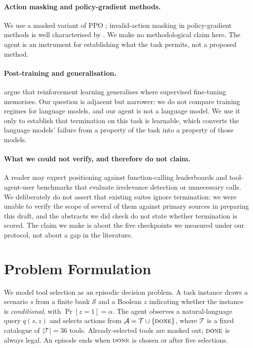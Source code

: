 \documentclass[11pt]{article}
\newcommand{\done}{\ensuremath{\text{\textsc{done}}}}
\begin{document}
\paragraph{Action masking and policy-gradient methods.}
We use a masked variant of PPO \citep{schulman2017ppo}; invalid-action masking in
policy-gradient methods is well characterised by \citet{huang2022masking}. We make
no methodological claim here. The agent is an instrument for establishing what the
task permits, not a proposed method.

\paragraph{Post-training and generalisation.}
\citet{chu2025sftrl} argue that reinforcement learning generalises where supervised
fine-tuning memorises. Our question is adjacent but narrower: we do not compare
training regimes for language models, and our agent is not a language model. We use
it only to establish that termination on this task is learnable, which converts the
language models' failure from a property of the task into a property of those
models.

\paragraph{What we could not verify, and therefore do not claim.}
A reader may expect positioning against function-calling leaderboards and
tool-agent-user benchmarks that evaluate irrelevance detection or unnecessary
calls. We deliberately do not assert that existing suites ignore termination: we
were unable to verify the scope of several of them against primary sources in
preparing this draft, and the abstracts we did check do not state whether
termination is scored. The claim we make is about the five checkpoints we
measured under our protocol, not about a gap in the literature.

\section{Problem Formulation}
\label{sec:formulation}

We model tool selection as an episodic decision problem. A task instance draws a
scenario $s$ from a finite bank $\mathcal{S}$ and a Boolean $z$ indicating whether
the instance is \emph{conditional}, with $\Pr[z=1] = \alpha$. The agent observes a
natural-language query $q(s,z)$ and selects actions from
$\mathcal{A} = \mathcal{T} \cup \{\done\}$, where $\mathcal{T}$ is a fixed
catalogue of $|\mathcal{T}| = 36$ tools. Already-selected tools are masked out;
$\done$ is always legal. An episode ends when $\done$ is chosen or after five
selections.
\end{document}
